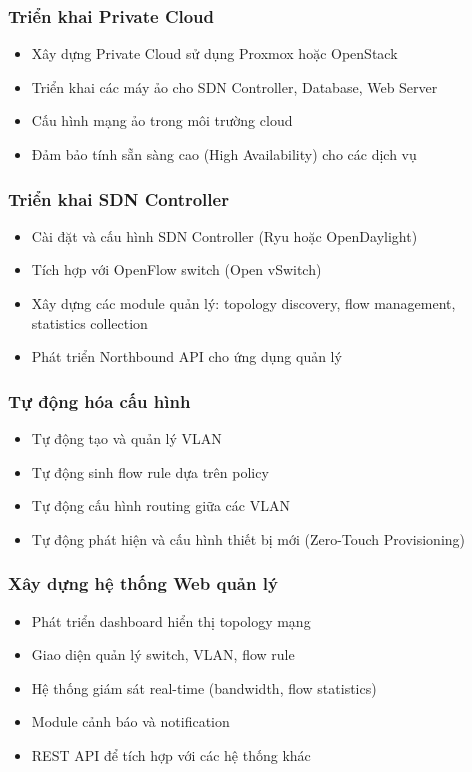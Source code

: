 \subsubsection{Triển khai Private Cloud}
\begin{itemize}
    \item Xây dựng Private Cloud sử dụng Proxmox hoặc OpenStack
    \item Triển khai các máy ảo cho SDN Controller, Database, Web Server
    \item Cấu hình mạng ảo trong môi trường cloud
    \item Đảm bảo tính sẵn sàng cao (High Availability) cho các dịch vụ
\end{itemize}

\subsubsection{Triển khai SDN Controller}
\begin{itemize}
    \item Cài đặt và cấu hình SDN Controller (Ryu hoặc OpenDaylight)
    \item Tích hợp với OpenFlow switch (Open vSwitch)
    \item Xây dựng các module quản lý: topology discovery, flow management, statistics collection
    \item Phát triển Northbound API cho ứng dụng quản lý
\end{itemize}

\subsubsection{Tự động hóa cấu hình}
\begin{itemize}
    \item Tự động tạo và quản lý VLAN
    \item Tự động sinh flow rule dựa trên policy
    \item Tự động cấu hình routing giữa các VLAN
    \item Tự động phát hiện và cấu hình thiết bị mới (Zero-Touch Provisioning)
\end{itemize}

\subsubsection{Xây dựng hệ thống Web quản lý}
\begin{itemize}
    \item Phát triển dashboard hiển thị topology mạng
    \item Giao diện quản lý switch, VLAN, flow rule
    \item Hệ thống giám sát real-time (bandwidth, flow statistics)
    \item Module cảnh báo và notification
    \item REST API để tích hợp với các hệ thống khác
\end{itemize}

